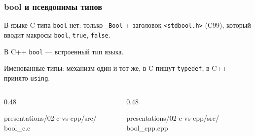 \documentclass[compress, 8pt, aspectratio=169]{beamer}
\begin{document}
\begin{frame}[fragile]

    \frametitle{bool и псевдонимы типов}

    \begin{myitemize}

        \item В языке C типа \texttt{bool} нет: только
        \texttt{\_Bool} + заголовок \texttt{<stdbool.h>} (C99),
        который вводит макросы \texttt{bool}, \texttt{true},
        \texttt{false}.

        \item В C++ \texttt{bool} --- встроенный тип языка.

        \item Именованные типы: механизм один и тот же,
        в C пишут \texttt{typedef}, в C++ принято \texttt{using}.

    \end{myitemize}

    \begin{columns}[T]

        \begin{column}{0.48\textwidth}

                {presentations/02-c-vs-cpp/src/}
                {bool_c.c}

        \end{column}

        \begin{column}{0.48\textwidth}

                {presentations/02-c-vs-cpp/src/}
                {bool_cpp.cpp}

        \end{column}

    \end{columns}

\end{frame}
\end{document}
